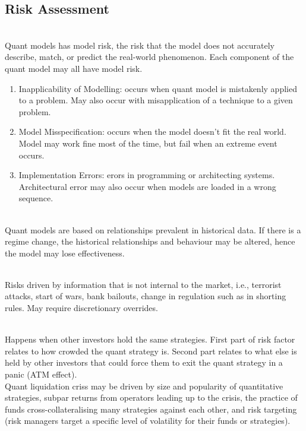\subsection{Risk Assessment}

\begin{definition} \\
Quant models has model risk, the risk that the model does not accurately describe, match, or predict the real-world phenomenon. Each component of the quant model may all have model risk.
\begin{enumerate}[label=\roman*.]
\setlength{\itemsep}{0pt}
\item Inapplicability of Modelling: occurs when quant model is mistakenly applied to a problem. May also occur with misapplication of a technique to a given problem.
\item Model Misspecification: occurs when the model doesn't fit the real world. Model may work fine most of the time, but fail when an extreme event occurs.
\item Implementation Errors: erors in programming or architecting systems. Architectural error may also occur when models are loaded in a wrong sequence.
\end{enumerate}
\end{definition}

\begin{definition} \\
Quant models are based on relationships prevalent in historical data. If there is a regime change, the historical relationships and behaviour may be altered, hence the model may lose effectiveness.
\end{definition}

\begin{definition} \\	
Risks driven by information that is not internal to the market, i.e., terrorist attacks, start of wars, bank bailouts, change in regulation such as in shorting rules. May require discretionary overrides.
\end{definition}

\begin{definition} \\
Happens when other investors hold the same strategies. First part of risk factor relates to how crowded the quant strategy is. Second part relates to what else is held by other investors that could force them to exit the quant strategy in a panic (ATM effect).\\
Quant liquidation criss may be driven by size and popularity of quantitative strategies, subpar returns from operators leading up to the crisis, the practice of funds cross-collateralising many strategies against each other, and risk targeting (risk managers target a specific level of volatility for their funds or strategies).
\end{definition}

